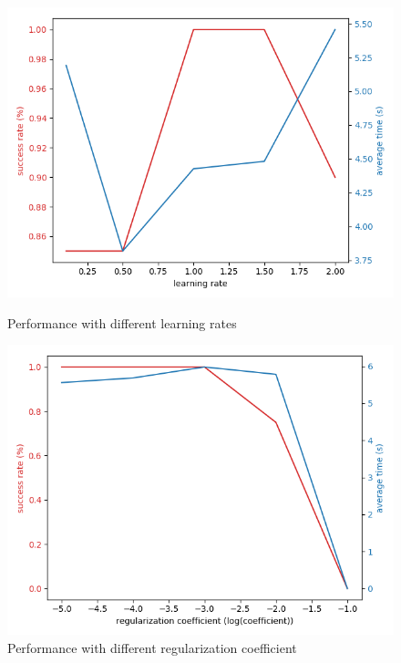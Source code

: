 \documentclass{article}
\begin{document}
\begin{figure}[t]
    \centering
    \begin{minipage}{.45\textwidth}
        \centering
        \includegraphics[width=\textwidth]{learning_rate}
        \caption{Performance with different learning rates} 
        \label{fig:lrate}    
    \end{minipage}%
    \hfill
    \begin{minipage}{.45\textwidth}
        \centering
        \includegraphics[width=\textwidth]{reg_coeff}
        \caption{Performance with different regularization coefficient}
        \label{fig:regcoeff}
    \end{minipage}
\end{figure}
\end{document}
